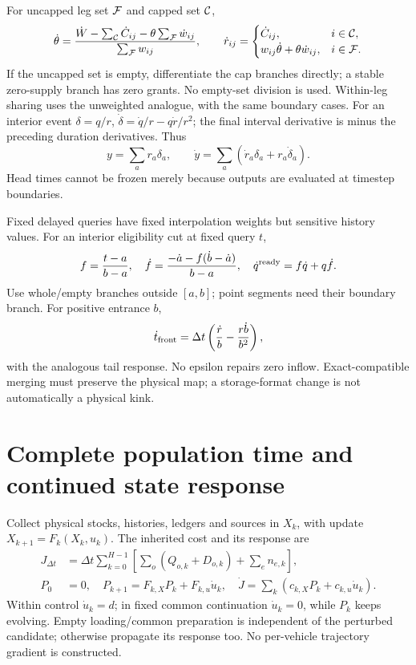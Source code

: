 \documentclass[10pt,a4paper]{article}
\begin{document}
For uncapped leg set ${\cal F}$ and capped set ${\cal C}$,
\begin{equation}
 \dot\theta=
 \frac{\dot W-\sum_{\cal C}\dot C_{ij}
               -\theta\sum_{\cal F}\dot w_{ij}}
      {\sum_{\cal F}w_{ij}},\qquad
 \dot r_{ij}=
 \begin{cases}
 \dot C_{ij},&i\in{\cal C},\\
 w_{ij}\dot\theta+\theta\dot w_{ij},&i\in{\cal F}.
 \end{cases}
 \label{eq:sharing-derivative}
\end{equation}
If the uncapped set is empty, differentiate the cap branches directly;
a stable zero-supply branch has zero grants. No empty-set division is used.
Within-leg sharing uses the unweighted analogue, with the same boundary cases.
For an interior event $\delta=q/r$,
$\dot\delta=\dot q/r-q\dot r/r^2$; the final interval derivative is minus
the preceding duration derivatives. Thus
\begin{equation}
 y=\sum_a r_a\delta_a,\qquad
 \dot y=\sum_a(\dot r_a\delta_a+r_a\dot\delta_a).
 \label{eq:service-derivative}
\end{equation}
Head times cannot be frozen merely because outputs are evaluated at
timestep boundaries.

Fixed delayed queries have fixed interpolation weights but sensitive
history values. For an interior eligibility cut at fixed query $t$,
\begin{equation}
 f=\frac{t-a}{b-a},\quad
 \dot f=\frac{-\dot a-f(\dot b-\dot a)}{b-a},\quad
 \dot q^{\rm ready}=f\dot q+q\dot f.
 \label{eq:eligibility-derivative}
\end{equation}
Use whole/empty branches outside $[a,b]$; point segments need their
boundary branch. For positive entrance $b$,
\begin{equation}
 \dot t_{\rm front}
 =\Delta t\left(\frac{\dot r}{b}-\frac{r\dot b}{b^2}\right),
 \label{eq:entry-derivative}
\end{equation}
with the analogous tail response. No epsilon repairs zero inflow.
Exact-compatible merging must preserve the physical map; a storage-format
change is not automatically a physical kink.

\section{Complete population time and continued state response}

Collect physical stocks, histories, ledgers and sources in $X_k$, with
update $X_{k+1}=F_k(X_k,u_k)$. The inherited cost and its response are
\begin{align}
 J_{\Delta t}
 &=\Delta t\sum_{k=0}^{H-1}
    \left[\sum_o(Q_{o,k}+D_{o,k})+\sum_en_{e,k}\right],
 \label{eq:tst}\\
 P_0&=0,\quad
 P_{k+1}=F_{k,X}P_k+F_{k,u}\dot u_k,\quad
 \dot J=\sum_k(c_{k,X}P_k+c_{k,u}\dot u_k).
 \label{eq:state-sensitivity}
\end{align}
Within control $\dot u_k=d$; in fixed common continuation $\dot u_k=0$,
while $P_k$ keeps evolving. Empty loading/common preparation is independent
of the perturbed candidate; otherwise propagate its response too.
No per-vehicle trajectory gradient is constructed.
\end{document}

